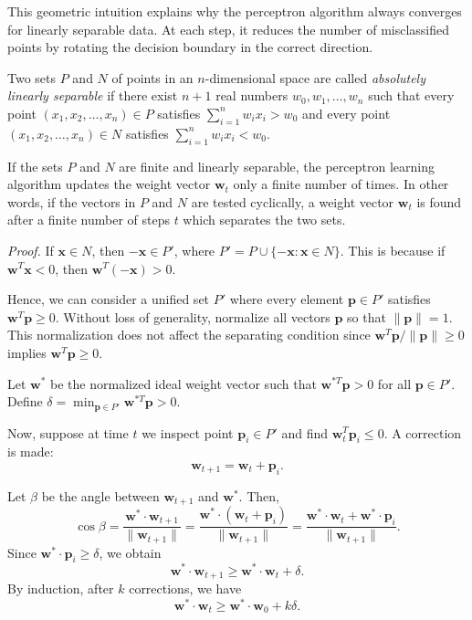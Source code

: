 This geometric intuition explains why the perceptron algorithm always converges for linearly separable data. At each step, it reduces the number of misclassified points by rotating the decision boundary in the correct direction.

\begin{definition}
Two sets $P$ and $N$ of points in an $n$-dimensional space are called \textit{absolutely linearly separable} if there exist $n + 1$ real numbers $w_0, w_1, \ldots, w_n$ such that every point $(x_1, x_2, \ldots, x_n) \in P$ satisfies $\sum_{i=1}^n w_i x_i > w_0$ and every point $(x_1, x_2, \ldots, x_n) \in N$ satisfies $\sum_{i=1}^n w_i x_i < w_0$.
\end{definition}

\begin{theorem}
If the sets $P$ and $N$ are finite and linearly separable, the perceptron learning algorithm updates the weight vector $\mathbf{w}_t$ only a finite number of times. In other words, if the vectors in $P$ and $N$ are tested cyclically, a weight vector $\mathbf{w}_t$ is found after a finite number of steps $t$ which separates the two sets.
\end{theorem}

\textit{Proof.} If $\mathbf{x} \in N$, then $-\mathbf{x} \in P'$, where $P' = P \cup \{-\mathbf{x} : \mathbf{x} \in N\}$. This is because if $\mathbf{w}^T \mathbf{x} < 0$, then $\mathbf{w}^T (-\mathbf{x}) > 0$.

Hence, we can consider a unified set $P'$ where every element $\mathbf{p} \in P'$ satisfies $\mathbf{w}^T \mathbf{p} \geq 0$. Without loss of generality, normalize all vectors $\mathbf{p}$ so that $\|\mathbf{p}\| = 1$. This normalization does not affect the separating condition since $\mathbf{w}^T \mathbf{p}/\|\mathbf{p}\| \geq 0$ implies $\mathbf{w}^T \mathbf{p} \geq 0$.

Let $\mathbf{w}^*$ be the normalized ideal weight vector such that $\mathbf{w}^{*T} \mathbf{p} > 0$ for all $\mathbf{p} \in P'$. Define $\delta = \min_{\mathbf{p} \in P'} \mathbf{w}^{*T} \mathbf{p} > 0$.

Now, suppose at time $t$ we inspect point $\mathbf{p}_i \in P'$ and find $\mathbf{w}_t^T \mathbf{p}_i \leq 0$. A correction is made: \[ \mathbf{w}_{t+1} = \mathbf{w}_t + \mathbf{p}_i. \]

Let $\beta$ be the angle between $\mathbf{w}_{t+1}$ and $\mathbf{w}^*$. Then,
\[
\cos \beta = \frac{\mathbf{w}^* \cdot \mathbf{w}_{t+1}}{\|\mathbf{w}_{t+1}\|} = \frac{\mathbf{w}^* \cdot (\mathbf{w}_t + \mathbf{p}_i)}{\|\mathbf{w}_{t+1}\|} = \frac{\mathbf{w}^* \cdot \mathbf{w}_t + \mathbf{w}^* \cdot \mathbf{p}_i}{\|\mathbf{w}_{t+1}\|}.
\]
Since $\mathbf{w}^* \cdot \mathbf{p}_i \geq \delta$, we obtain
\[ \mathbf{w}^* \cdot \mathbf{w}_{t+1} \geq \mathbf{w}^* \cdot \mathbf{w}_t + \delta. \]
By induction, after $k$ corrections, we have
\[ \mathbf{w}^* \cdot \mathbf{w}_t \geq \mathbf{w}^* \cdot \mathbf{w}_0 + k\delta. \]

